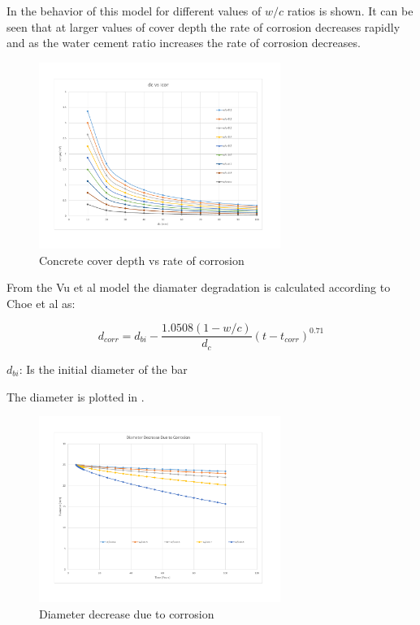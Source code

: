 In  the behavior of this model for different values of $w/c$ ratios is shown. It can be seen that at larger values of cover depth the rate of corrosion decreases rapidly and as the water cement ratio increases the rate of corrosion decreases.
%
\begin{figure}[htbp]
\centering
\includegraphics[width=0.7\textwidth]{Chapter-1/figs/dcvsicor}
\caption{Concrete cover depth vs rate of corrosion}
\label{fig:hist1}
\end{figure}

From the Vu et al model the diamater degradation is calculated according to Choe et al as:

\begin{equation}
  d_{corr}=d_{bi}-\frac{1.0508(1-w/c)}{d_c} (t-t_{corr})^{0.71}
  \label{eq.six}
\end{equation} 

$d_{bi}$: Is the initial diameter of the bar

The diameter is plotted in .

\begin{figure}[htbp]
\centering
\includegraphics[width=0.7\textwidth]{Chapter-1/figs/DiameterDecrease}
\caption{Diameter decrease due to corrosion}
\label{fig:hist2}
\end{figure}

